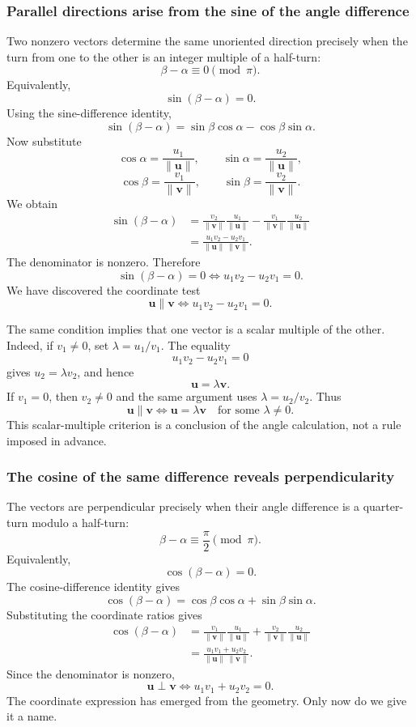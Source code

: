 \subsubsection{Parallel directions arise from the sine of the angle difference}

Two nonzero vectors determine the same unoriented direction precisely when the
turn from one to the other is an integer multiple of a half-turn:
\[
\beta-\alpha\equiv0\pmod{\pi}.
\]
Equivalently,
\[
\sin(\beta-\alpha)=0.
\]
Using the sine-difference identity,
\[
\sin(\beta-\alpha)
=
\sin\beta\cos\alpha-
\cos\beta\sin\alpha.
\]
Now substitute
\[
\cos\alpha=\frac{u_1}{\|\mathbf u\|},
\qquad
\sin\alpha=\frac{u_2}{\|\mathbf u\|},
\]
\[
\cos\beta=\frac{v_1}{\|\mathbf v\|},
\qquad
\sin\beta=\frac{v_2}{\|\mathbf v\|}.
\]
We obtain
\[
\begin{aligned}
\sin(\beta-\alpha)
&=
\frac{v_2}{\|\mathbf v\|}
\frac{u_1}{\|\mathbf u\|}
-
\frac{v_1}{\|\mathbf v\|}
\frac{u_2}{\|\mathbf u\|}\\
&=
\frac{u_1v_2-u_2v_1}
{\|\mathbf u\|\,\|\mathbf v\|}.
\end{aligned}
\]
The denominator is nonzero. Therefore
\[
\sin(\beta-\alpha)=0
\iff
u_1v_2-u_2v_1=0.
\]
We have discovered the coordinate test
\[
\mathbf u\parallel\mathbf v
\iff
u_1v_2-u_2v_1=0.
\]

The same condition implies that one vector is a scalar multiple of the other.
Indeed, if $v_1\neq0$, set $\lambda=u_1/v_1$. The equality
\[
u_1v_2-u_2v_1=0
\]
gives $u_2=\lambda v_2$, and hence
\[
\mathbf u=\lambda\mathbf v.
\]
If $v_1=0$, then $v_2\neq0$ and the same argument uses
$\lambda=u_2/v_2$. Thus
\[
\mathbf u\parallel\mathbf v
\iff
\mathbf u=\lambda\mathbf v
\quad\text{for some }\lambda\neq0.
\]
This scalar-multiple criterion is a conclusion of the angle calculation, not a
rule imposed in advance.

\subsubsection{The cosine of the same difference reveals perpendicularity}

The vectors are perpendicular precisely when their angle difference is a
quarter-turn modulo a half-turn:
\[
\beta-\alpha
\equiv
\frac{\pi}{2}
\pmod{\pi}.
\]
Equivalently,
\[
\cos(\beta-\alpha)=0.
\]
The cosine-difference identity gives
\[
\cos(\beta-\alpha)
=
\cos\beta\cos\alpha+
\sin\beta\sin\alpha.
\]
Substituting the coordinate ratios gives
\[
\begin{aligned}
\cos(\beta-\alpha)
&=
\frac{v_1}{\|\mathbf v\|}
\frac{u_1}{\|\mathbf u\|}
+
\frac{v_2}{\|\mathbf v\|}
\frac{u_2}{\|\mathbf u\|}\\
&=
\frac{u_1v_1+u_2v_2}
{\|\mathbf u\|\,\|\mathbf v\|}.
\end{aligned}
\]
Since the denominator is nonzero,
\[
\mathbf u\perp\mathbf v
\iff
u_1v_1+u_2v_2=0.
\]
The coordinate expression has emerged from the geometry. Only now do we give it
a name.

